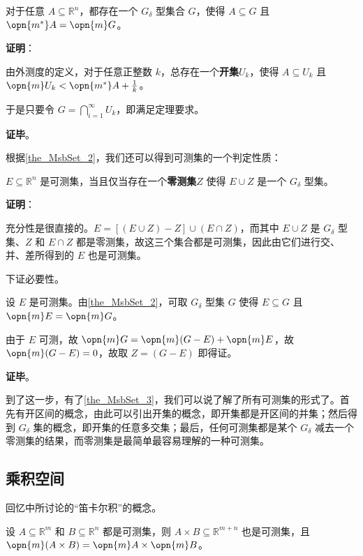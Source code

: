 \begin{theorem}{}\label{the_MsbSet_2}
对于任意 $A\subseteq \mathbb{R}^n$，都存在一个 $G_\delta$ 型集合 $G$，使得 $A\subseteq G$ 且 $\opn{m^*}A=\opn{m}G$。
\end{theorem}

\textbf{证明}：

由外测度的定义，对于任意正整数 $k$，总存在一个\textbf{开集}$U_k$，使得 $A\subseteq U_k$ 且 $\opn{m}U_k<\opn{m^*}A+\frac{1}{k}$。

于是只要令 $G=\bigcap_{i=1}^\infty U_k$，即满足定理要求。

\textbf{证毕}。








根据\autoref{the_MsbSet_2}，我们还可以得到可测集的一个判定性质：

\begin{theorem}{}\label{the_MsbSet_3}
$E\subseteq \mathbb{R}^n$ 是可测集，当且仅当存在一个\textbf{零测集}$Z$ 使得 $E\cup Z$ 是一个 $G_\delta$ 型集。
\end{theorem}

\textbf{证明}：

充分性是很直接的。$E=[(E\cup Z)-Z]\cup(E\cap Z)$，而其中 $E\cup Z$ 是 $G_\delta$ 型集、$Z$ 和 $E\cap Z$ 都是零测集，故这三个集合都是可测集，因此由它们进行交、并、差所得到的 $E$ 也是可测集。

下证必要性。

设 $E$ 是可测集。由\autoref{the_MsbSet_2}，可取 $G_\delta$ 型集 $G$ 使得 $E\subseteq G$ 且 $\opn{m}E=\opn{m}G$。

由于 $E$ 可测，故 $\opn{m}G=\opn{m}(G-E)+\opn{m}E$，故 $\opn{m}(G-E)=0$，故取 $Z=(G-E)$ 即得证。

\textbf{证毕}。

到了这一步，有了\autoref{the_MsbSet_3}，我们可以说了解了所有可测集的形式了。首先有开区间的概念，由此可以引出开集的概念，即开集都是开区间的并集；然后得到 $G_\delta$ 集的概念，即开集的任意多交集；最后，任何可测集都是某个 $G_\delta$ 减去一个零测集的结果，而零测集是最简单最容易理解的一种可测集。


\subsection{乘积空间}

回忆中所讨论的“笛卡尔积”的概念。

\begin{theorem}{}
设 $A\subseteq\mathbb{R}^m$ 和 $B\subseteq\mathbb{R}^n$ 都是可测集，则 $A\times B \subseteq \mathbb{R}^{m+n}$ 也是可测集，且 $\opn{m}(A\times B)=\opn{m}A\times \opn{m}B$。
\end{theorem}

